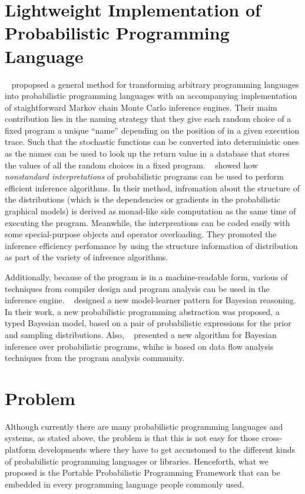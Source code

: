 \section{Lightweight Implementation of Probabilistic Programming Language}
~\cite{lightweight} propopsed a general method for transforming arbitrary programming languages into probabilistic programming languages with an accompanying implementation of staightforward Markov chain Monte Carlo inference engines. Their maim contribution lies in the naming strategy that they give each random choice of a fixed program a unique ``name'' depending on the position of in a given execution trace. Such that the stochastic functions can be converted into deterministic ones as the names can be used to look up the return value in a database that stores the values of all the random choices in a fixed program. ~\cite{nonstandard} showed how \textit{nonstandard interpretations} of probabilistic programs can be used to perform efficient inference algorithms. In their method, infromation about the structure of the distributions (which is the dependencies or gradients in the probabilistic graphical models) is derived as monad-like side computation as the same time of executing the program. Meanwhile, the interpreations can be coded easily with some special-purpose objects and operator overloading. They promoted the inference efficiency perfomance by using the structure information of distribution as part of the variety of infreence algorithms.

Additionally, because of the program is in a machine-readable form, various of techniques from compiler design and program analysis can be used in the inference engine. ~\cite{gordon2013} designed a new model-learner pattern for Bayesian reasoning. In their work, a new probabilistic programming abstraction was proposed, a typed Bayesian model, based on a pair of probabilistic expressions for the prior and sampling distributions. Also, ~\cite{dataflow} presented a new algorithm for Bayesian inference over probabilistic programs, whihc is based on data flow analysis techniques from the program analysis community.

\section{Problem}
\label{sec:prob}

Although currently there are many probabilistic programming languages and systems, as stated above, the problem is that this is not easy for those cross-platform developments where they have to get accustomed to the different kinds of probabilistic programming languages or libraries. Henceforth, what we proposed is the Portable Probabilistic Programming Framework that can be embedded in every programming language people commonly used.

